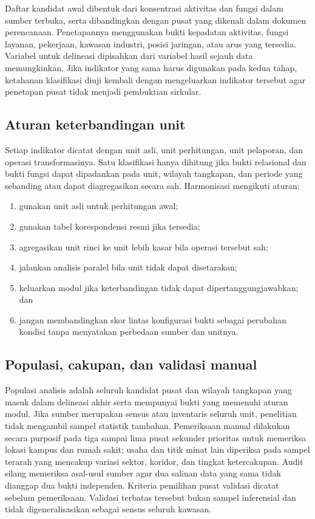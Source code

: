 \documentclass[11pt,a4paper,oneside,openany,indonesian]{report}
\begin{document}
Daftar kandidat awal dibentuk dari konsentrasi aktivitas dan fungsi
dalam sumber terbuka, serta dibandingkan dengan pusat yang dikenali
dalam dokumen perencanaan. Penetapannya menggunakan bukti kepadatan
aktivitas, fungsi layanan, pekerjaan, kawasan industri, posisi jaringan,
atau arus yang tersedia. Variabel untuk delineasi dipisahkan dari
variabel hasil sejauh data memungkinkan. Jika indikator yang sama harus
digunakan pada kedua tahap, ketahanan klasifikasi diuji kembali dengan
mengeluarkan indikator tersebut agar penetapan pusat tidak menjadi
pembuktian sirkular.

\subsection{Aturan keterbandingan
unit}\label{aturan-keterbandingan-unit}

Setiap indikator dicatat dengan unit asli, unit perhitungan, unit
pelaporan, dan operasi transformasinya. Satu klasifikasi hanya dihitung
jika bukti relasional dan bukti fungsi dapat dipadankan pada unit,
wilayah tangkapan, dan periode yang sebanding atau dapat diagregasikan
secara sah. Harmonisasi mengikuti aturan:

\begin{enumerate}
\def\labelenumi{\arabic{enumi}.}
\tightlist
\item
  gunakan unit asli untuk perhitungan awal;
\item
  gunakan tabel korespondensi resmi jika tersedia;
\item
  agregasikan unit rinci ke unit lebih kasar bila operasi tersebut sah;
\item
  jalankan analisis paralel bila unit tidak dapat disetarakan;
\item
  keluarkan modul jika keterbandingan tidak dapat dipertanggungjawabkan;
  dan
\item
  jangan membandingkan skor lintas konfigurasi bukti sebagai perubahan
  kondisi tanpa menyatakan perbedaan sumber dan unitnya.
\end{enumerate}

\subsection{Populasi, cakupan, dan validasi
manual}\label{populasi-cakupan-dan-validasi-manual}

Populasi analisis adalah seluruh kandidat pusat dan wilayah tangkapan
yang masuk dalam delineasi akhir serta mempunyai bukti yang memenuhi
aturan modul. Jika sumber merupakan sensus atau inventaris seluruh unit,
penelitian tidak mengambil sampel statistik tambahan. Pemeriksaan manual
dilakukan secara purposif pada tiga sampai lima pusat sekunder prioritas
untuk memeriksa lokasi kampus dan rumah sakit; usaha dan titik minat
lain diperiksa pada sampel terarah yang mencakup variasi sektor,
koridor, dan tingkat ketercakupan. Audit silang memeriksa asal-usul
sumber agar dua salinan data yang sama tidak dianggap dua bukti
independen. Kriteria pemilihan pusat validasi dicatat sebelum
pemeriksaan. Validasi terbatas tersebut bukan sampel inferensial dan
tidak digeneralisasikan sebagai sensus seluruh kawasan.
\end{document}
